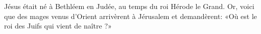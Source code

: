 Jésus était né à Bethléem en Judée, au temps du roi Hérode le Grand.
Or, voici que des mages venus d’Orient arrivèrent à Jérusalem et demandèrent:
	«Où est le roi des Juifs qui vient de naître ?»
